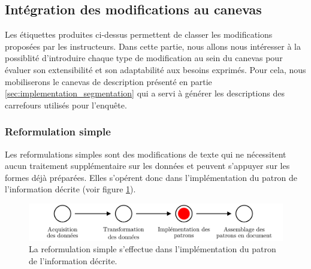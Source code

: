 \subsection{Intégration des modifications au canevas}
\label{sec:evaluation_pipeline}

Les étiquettes produites ci-dessus permettent de classer les modifications proposées par les instructeurs. Dans cette partie, nous allons nous intéresser à la possiblité d'introduire chaque type de modification au sein du canevas pour évaluer son  extensibilité et son adaptabilité aux besoins exprimés. Pour cela, nous mobiliserons le canevas de description présenté en partie \ref{sec:implementation_segmentation} qui a servi à générer les descriptions des carrefours utilisés pour l'enquête.


\subsubsection{Reformulation simple}

Les reformulations simples sont des modifications de texte qui ne nécessitent aucun traitement supplémentaire sur les données et peuvent s'appuyer sur les formes déjà préparées. Elles s'opérent donc dans l'implémentation du patron de l'information décrite (voir figure \ref{fig:evaluation_reformulation_simple}). 

\begin{figure}
    \centering
    \includegraphics[width=\textwidth]{images/evaluation/pipeline/pipeline_reformulation_simple.pdf}
    \caption[Reformulation simple dans la chaîne de description]{La reformulation simple s'effectue dans l'implémentation du patron de l'information décrite.}
    \label{fig:evaluation_reformulation_simple}
\end{figure}

\newpar{}

